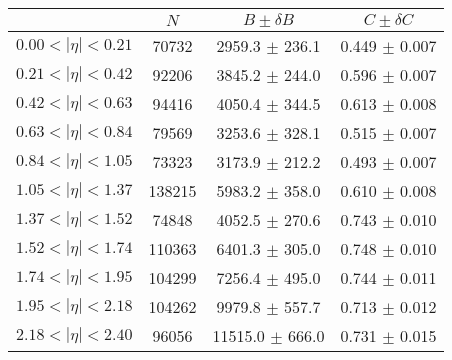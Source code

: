 \begin{tabular}{lccc}
\hline
    &   $N$   & $B \pm \delta B$  &  $C \pm \delta C$ \\
\hline
$0.00 < |\eta| <0.21$          & 70732      & 2959.3     $\pm$ 236.1 & 0.449      $\pm$ 0.007 \\
$0.21 < |\eta| <0.42$          & 92206      & 3845.2     $\pm$ 244.0 & 0.596      $\pm$ 0.007 \\
$0.42 < |\eta| <0.63$          & 94416      & 4050.4     $\pm$ 344.5 & 0.613      $\pm$ 0.008 \\
$0.63 < |\eta| <0.84$          & 79569      & 3253.6     $\pm$ 328.1 & 0.515      $\pm$ 0.007 \\
$0.84 < |\eta| <1.05$          & 73323      & 3173.9     $\pm$ 212.2 & 0.493      $\pm$ 0.007 \\
$1.05 < |\eta| <1.37$          & 138215     & 5983.2     $\pm$ 358.0 & 0.610      $\pm$ 0.008 \\
$1.37 < |\eta| <1.52$          & 74848      & 4052.5     $\pm$ 270.6 & 0.743      $\pm$ 0.010 \\
$1.52 < |\eta| <1.74$          & 110363     & 6401.3     $\pm$ 305.0 & 0.748      $\pm$ 0.010 \\
$1.74 < |\eta| <1.95$          & 104299     & 7256.4     $\pm$ 495.0 & 0.744      $\pm$ 0.011 \\
$1.95 < |\eta| <2.18$          & 104262     & 9979.8     $\pm$ 557.7 & 0.713      $\pm$ 0.012 \\
$2.18 < |\eta| <2.40$          & 96056      & 11515.0    $\pm$ 666.0 & 0.731      $\pm$ 0.015 \\
\hline
\end{tabular}
